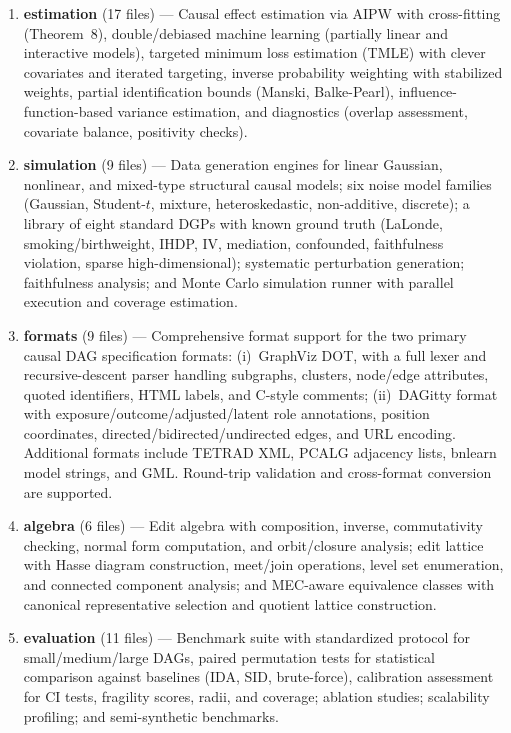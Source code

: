 \documentclass[11pt,a4paper]{article}
\theoremstyle{definition}
\theoremstyle{remark}
\begin{document}
\begin{enumerate}
  \item \textbf{estimation} (17 files) --- Causal effect estimation via AIPW
    with cross-fitting (Theorem~8), double/debiased machine learning (partially
    linear and interactive models), targeted minimum loss estimation (TMLE) with
    clever covariates and iterated targeting, inverse probability weighting with
    stabilized weights, partial identification bounds (Manski, Balke-Pearl),
    influence-function-based variance estimation, and diagnostics (overlap
    assessment, covariate balance, positivity checks).

  \item \textbf{simulation} (9 files) --- Data generation engines for linear
    Gaussian, nonlinear, and mixed-type structural causal models; six noise
    model families (Gaussian, Student-$t$, mixture, heteroskedastic,
    non-additive, discrete); a library of eight standard DGPs with known ground
    truth (LaLonde, smoking/birthweight, IHDP, IV, mediation, confounded,
    faithfulness violation, sparse high-dimensional); systematic perturbation
    generation; faithfulness analysis; and Monte Carlo simulation runner with
    parallel execution and coverage estimation.

  \item \textbf{formats} (9 files) --- Comprehensive format support for the two
    primary causal DAG specification formats: (i)~GraphViz DOT, with a full
    lexer and recursive-descent parser handling subgraphs, clusters, node/edge
    attributes, quoted identifiers, HTML labels, and C-style comments;
    (ii)~DAGitty format with exposure/outcome/adjusted/latent role annotations,
    position coordinates, directed/bidirected/undirected edges, and URL encoding.
    Additional formats include TETRAD XML, PCALG adjacency lists, bnlearn model
    strings, and GML. Round-trip validation and cross-format conversion are
    supported.

  \item \textbf{algebra} (6 files) --- Edit algebra with composition, inverse,
    commutativity checking, normal form computation, and orbit/closure analysis;
    edit lattice with Hasse diagram construction, meet/join operations, level
    set enumeration, and connected component analysis; and MEC-aware equivalence
    classes with canonical representative selection and quotient lattice
    construction.

  \item \textbf{evaluation} (11 files) --- Benchmark suite with standardized
    protocol for small/medium/large DAGs, paired permutation tests for
    statistical comparison against baselines (IDA, SID, brute-force), calibration
    assessment for CI tests, fragility scores, radii, and coverage; ablation
    studies; scalability profiling; and semi-synthetic benchmarks.


\end{enumerate}
\end{document}

